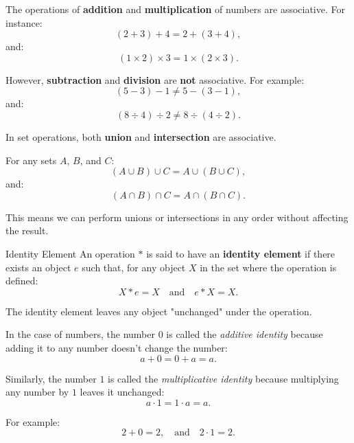 \begin{example}
    The operations of \textbf{addition} and \textbf{multiplication} of numbers are associative. For instance:
    \[
    (2 + 3) + 4 = 2 + (3 + 4),
    \]
    and:
    \[
    (1 \times 2) \times 3 = 1 \times (2 \times 3).
    \]
    
    However, \textbf{subtraction} and \textbf{division} are \textbf{not} associative. For example:
    \[
    (5 - 3) - 1 \neq 5 - (3 - 1),
    \]
    and:
    \[
    (8 \div 4) \div 2 \neq 8 \div (4 \div 2).
    \]
\end{example}

\begin{example}
    In set operations, both \textbf{union} and \textbf{intersection} are associative.
    
    For any sets \( A \), \( B \), and \( C \):
    \[
    (A \cup B) \cup C = A \cup (B \cup C),
    \]
    and:
    \[
    (A \cap B) \cap C = A \cap (B \cap C).
    \]
    
    This means we can perform unions or intersections in any order without affecting the result.
\end{example}    

\begin{definitionbox}{Identity Element}
    An operation \( * \) is said to have an \textbf{identity element} if there exists an object \( e \) such that, for any object \( X \) in the set where the operation is defined:
    \[
    X * e = X \quad \text{and} \quad e * X = X.
    \]
    
    The identity element leaves any object "unchanged" under the operation.
\end{definitionbox}

\begin{example}
    In the case of numbers, the number \( 0 \) is called the \textit{additive identity} because adding it to any number doesn’t change the number:
    \[
    a + 0 = 0 + a = a.
    \]
    
    Similarly, the number \( 1 \) is called the \textit{multiplicative identity} because multiplying any number by \( 1 \) leaves it unchanged:
    \[
    a \cdot 1 = 1 \cdot a = a.
    \]
    
    For example:
    \[
    2 + 0 = 2, \quad \text{and} \quad 2 \cdot 1 = 2.
    \]
\end{example}            

